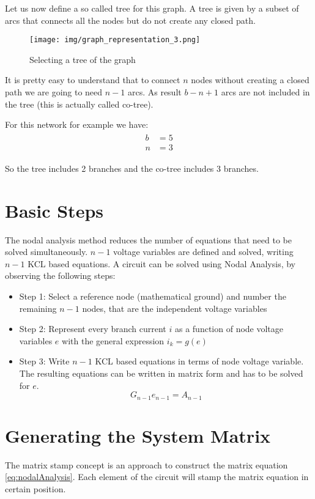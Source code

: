 Let us now define a so called tree for this graph. A tree is given by a subset of arcs that connects all the nodes but do not create any closed path.

\begin{figure}[ht]
	\centering
	\texttt{[image: img/graph\_representation\_3.png]} 
	\caption{Selecting a tree of the graph}
	\label{fig:graph_rep_3}
\end{figure}

It is pretty easy to understand that to connect $n$ nodes without creating a closed path we are going to need $n-1$ arcs. As result $b-n+1$ arcs are not included in the tree (this is actually called co-tree).

For this network for example we have:
\begin{align}
\begin{split}
	b &= 5 \\
	n &= 3
\end{split}
\end{align}

So the tree includes 2 branches and the co-tree includes 3 branches.

\section{Basic Steps}
The nodal analysis method reduces the number of equations that need to be solved simultaneously. $n-1$ voltage variables are defined and solved, writing $n-1$ KCL based equations. 
A circuit can be solved using Nodal Analysis, by observing the following steps:

\begin{itemize}
\item Step 1: Select a reference node (mathematical ground) and number the remaining $n-1$ nodes, that are the independent voltage variables
\item Step 2: Represent every branch current $i$ as a function of node voltage variables $e$ with the general expression $i_k = g(e)$
\item Step 3: Write $n-1$ KCL based equations in terms of node voltage variable. The resulting equations can be written in matrix form and has to be solved for $e$.
\begin{equation} \label{eq:nodalAnalysis}
G_{n-1}e_{n-1} =  A_{n-1}
\end{equation}
\end{itemize}

\section{Generating the System Matrix}
The matrix stamp concept is an approach to construct the matrix equation \ref{eq:nodalAnalysis}. Each element of the circuit will stamp the matrix equation in certain position.

